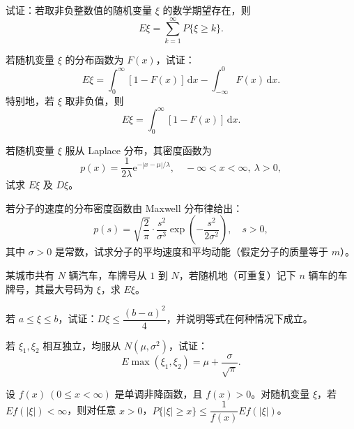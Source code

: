 \documentclass[../../main.tex]{subfiles}
\begin{document}
\begin{exercise}\label{exercise:ch04-07}
试证：若取非负整数值的随机变量 $\xi$ 的数学期望存在，则
\[
E\xi=\sum_{k=1}^{\infty}P\{\xi\geqslant k\}.
\]
\end{exercise}

\begin{exercise}\label{exercise:ch04-08}
若随机变量 $\xi$ 的分布函数为 $F(x)$，试证：
\[
E\xi=\int_0^{\infty}[1-F(x)]\,\mathrm{d}x-\int_{-\infty}^0 F(x)\,\mathrm{d}x.
\]
特别地，若 $\xi$ 取非负值，则
\[
E\xi=\int_0^{\infty}[1-F(x)]\,\mathrm{d}x.
\]
\end{exercise}

\begin{exercise}\label{exercise:ch04-09}
若随机变量 $\xi$ 服从 Laplace 分布，其密度函数为
\[
p(x)=\frac{1}{2\lambda}\mathrm{e}^{-|x-\mu|/\lambda},\quad -\infty<x<\infty,\ \lambda>0,
\]
试求 $E\xi$ 及 $D\xi$。
\end{exercise}

\begin{exercise}\label{exercise:ch04-10}
若分子的速度的分布密度函数由 Maxwell 分布律给出：
\[
p(s)=\sqrt{\frac{2}{\pi}}\cdot\frac{s^2}{\sigma^3}\exp\left(-\frac{s^2}{2\sigma^2}\right),\quad s>0,
\]
其中 $\sigma>0$ 是常数，试求分子的平均速度和平均动能（假定分子的质量等于 $m$）。
\end{exercise}

\begin{exercise}\label{exercise:ch04-11}
某城市共有 $N$ 辆汽车，车牌号从 $1$ 到 $N$，若随机地（可重复）记下 $n$ 辆车的车牌号，其最大号码为 $\xi$，求 $E\xi$。
\end{exercise}

\begin{exercise}\label{exercise:ch04-12}
若 $a\leqslant\xi\leqslant b$，试证：$D\xi\leqslant\dfrac{(b-a)^2}{4}$，并说明等式在何种情况下成立。
\end{exercise}

\begin{exercise}\label{exercise:ch04-13}
若 $\xi_1,\xi_2$ 相互独立，均服从 $N(\mu,\sigma^2)$，试证：
\[
E\max(\xi_1,\xi_2)=\mu+\frac{\sigma}{\sqrt{\pi}}.
\]
\end{exercise}

\begin{exercise}\label{exercise:ch04-14}
设 $f(x)\ (0\leqslant x<\infty)$ 是单调非降函数，且 $f(x)>0$。对随机变量 $\xi$，若 $Ef(|\xi|)<\infty$，则对任意 $x>0$，$P\{|\xi|\geqslant x\}\leqslant\dfrac{1}{f(x)}Ef(|\xi|)$。
\end{exercise}
\end{document}
